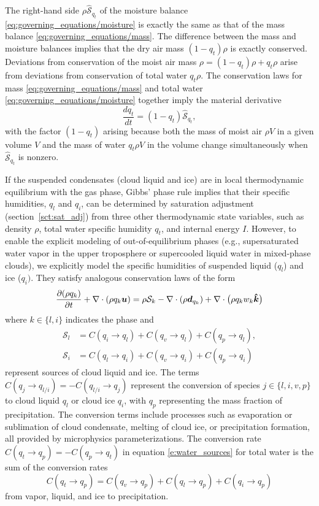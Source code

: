 \documentclass{report}
\begin{document}
The right-hand side $\rho \mathcal{\hat S}_{q_t}$ of the moisture balance \eqref{eq:governing_equations/moisture} is exactly the same as that of the mass balance \eqref{eq:governing_equations/mass}. The difference between the mass and moisture balances implies that the dry air mass $(1-q_t)\rho$ is exactly conserved. Deviations from conservation of the moist air mass $\rho = (1-q_t)\rho + q_t \rho$ arise from deviations from conservation of total water $q_t\rho$. The conservation laws for mass \eqref{eq:governing_equations/mass} and total water \eqref{eq:governing_equations/moisture} together imply the material derivative 
\[
\frac{dq_t}{dt} = (1-q_t) \mathcal{\hat S}_{q_t},
\]
with the factor $(1-q_t)$ arising because both the mass of moist air $\rho V$ in a given volume $V$ and the mass of water $q_t \rho V$ in the volume change simultaneously when $\mathcal{\hat S}_{q_t}$ is nonzero.

If the suspended condensates (cloud liquid and ice) are in local thermodynamic equilibrium with the gas phase, Gibbs' phase rule implies that their specific humidities, $q_l$ and $q_i$, can be determined by saturation adjustment (section~\ref{sct:sat_adj}) from three other thermodynamic state variables, such as density $\rho$, total water specific humidity $q_t$, and internal energy $I$. However, to enable the explicit modeling of out-of-equilibrium phases (e.g., supersaturated water vapor in the upper troposphere or supercooled liquid water in mixed-phase clouds), we explicitly model the specific humidities of suspended liquid ($q_l$) and ice ($q_i)$. They satisfy analogous conservation laws of the form
\begin{equation}
\frac{\partial (\rho q_k)}{\partial t} + \nabla \cdot (\rho q_k \boldsymbol{{u}}) = \rho \mathcal{S}_k  -\nabla \cdot (\rho \boldsymbol{{d}}_{q_k}) + \nabla \cdot \bigl(\rho q_k w_k \boldsymbol{{\hat k}} \bigr)  
\label{eq:governing_equations/condensate}
\end{equation}
where $k \in \{l, i\}$ indicates the phase and 
\begin{align}
    \mathcal{S}_l & = C(q_i \rightarrow q_l) + C(q_v \rightarrow q_l) + C(q_p \rightarrow q_l), \\
    \mathcal{S}_i & = C(q_l \rightarrow q_i) + C(q_v \rightarrow q_i) + C(q_p \rightarrow q_i)
\end{align}
represent sources of cloud liquid and ice. The terms $C(q_j \rightarrow q_{l/i}) = - C(q_{l/i} \rightarrow q_j)$ represent the conversion of species $j \in \{l, i, v, p\}$ to cloud liquid $q_l$ or cloud ice $q_i$, with $q_p$ representing the mass fraction of precipitation. The conversion terms include processes such as evaporation or sublimation of cloud condensate, melting of cloud ice, or precipitation formation, all provided by microphysics parameterizations. The conversion rate $C(q_t \rightarrow q_p) = -C(q_p \rightarrow q_t)$ in equation \eqref{e:water_sources} for total water is the sum of the conversion rates
\begin{equation}
    C(q_t \rightarrow q_p) = C(q_v \rightarrow q_p) + C(q_l \rightarrow q_p) + C(q_i \rightarrow q_p)
\end{equation}
from vapor, liquid, and ice to precipitation. 
\end{document}
